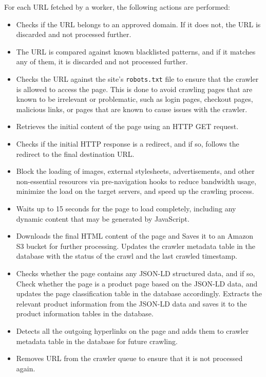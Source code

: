 For each URL fetched by a worker, the following actions are performed:
\begin{itemize}
    \item Checks if the URL belongs to an approved domain.
    If it does not, the URL is discarded and not processed further.
    \item The URL is compared against known blacklisted patterns, and if it matches any of them, it is discarded and not processed further.
    \item Checks the URL against the site's \texttt{robots.txt} file to ensure that the crawler is allowed to access the page.
    This is done to avoid crawling pages that are known to be irrelevant or problematic, such as login pages, checkout pages, malicious links, or pages that are known to cause issues with the crawler.
    \item Retrieves the initial content of the page using an HTTP GET request.
    \item Checks if the initial HTTP response is a redirect, and if so, follows the redirect to the final destination URL.
    \item Block the loading of images, external stylesheets, advertisements, and other non-essential resources via pre-navigation hooks to reduce bandwidth usage, minimize the load on the target servers, and speed up the crawling process.
    \item Waits up to 15 seconds for the page to load completely, including any dynamic content that may be generated by JavaScript.
    \item Downloads the final HTML content of the page and
        \subitem Saves it to an Amazon S3 bucket for further processing.
        \subitem Updates the crawler metadata table in the database with the status of the crawl and the last crawled timestamp.
    \item Checks whether the page contains any JSON-LD structured data, and if so,
        \subitem Check whether the page is a product page based on the JSON-LD data, and updates the page classification table in the database accordingly.
        \subitem Extracts the relevant product information from the JSON-LD data and saves it to the product information tables in the database.
    \item Detects all the outgoing hyperlinks on the page and adds them to crawler metadata table in the database for future crawling.
    \item Removes URL from the crawler queue to ensure that it is not processed again.
\end{itemize}

